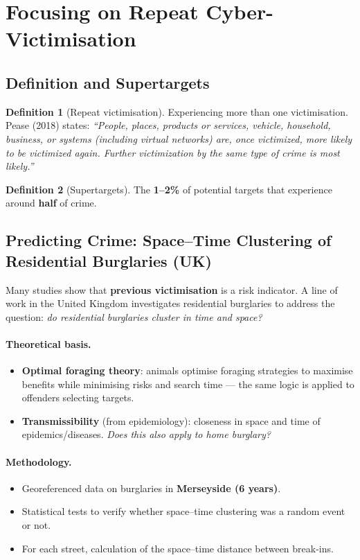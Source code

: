 \documentclass[11pt,a4paper,openany]{report}
\theoremstyle{definition}
\newtheorem{definition}{Definition}[chapter]
\theoremstyle{plain}
\theoremstyle{remark}
\begin{document}
\section{Focusing on Repeat Cyber-Victimisation}

\subsection{Definition and Supertargets}

\begin{definition}[Repeat victimisation]
Experiencing more than one victimisation. Pease (2018) states: \textit{``People, places, products or services, vehicle, household, business, or systems (including virtual networks) are, once victimized, more likely to be victimized again. Further victimization by the same type of crime is most likely.''}
\end{definition}

\begin{definition}[Supertargets]
The \textbf{1--2\%} of potential targets that experience around \textbf{half} of crime.
\end{definition}

\subsection{Predicting Crime: Space--Time Clustering of Residential Burglaries (UK)}

Many studies show that \textbf{previous victimisation} is a risk indicator. A line of work in the United Kingdom investigates residential burglaries to address the question: \textit{do residential burglaries cluster in time and space?}

\paragraph{Theoretical basis.}
\begin{itemize}
    \item \textbf{Optimal foraging theory}: animals optimise foraging strategies to maximise benefits while minimising risks and search time --- the same logic is applied to offenders selecting targets.
    \item \textbf{Transmissibility} (from epidemiology): closeness in space and time of epidemics/diseases. \textit{Does this also apply to home burglary?}
\end{itemize}

\paragraph{Methodology.}
\begin{itemize}
    \item Georeferenced data on burglaries in \textbf{Merseyside (6 years)}.
    \item Statistical tests to verify whether space--time clustering was a random event or not.
    \item For each street, calculation of the space--time distance between break-ins.
\end{itemize}
\end{document}
